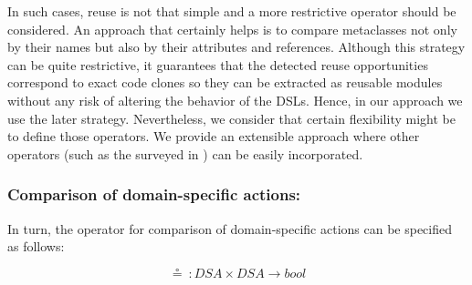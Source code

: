 In such cases, reuse is not that simple and a more restrictive operator should be considered. An approach that certainly helps is to compare metaclasses not only by their names but also by their attributes and references. Although this strategy can be quite restrictive, it guarantees that the detected reuse opportunities correspond to exact code clones so they can be extracted as reusable modules without any risk of altering the behavior of the DSLs. Hence, in our approach we use the later strategy. Nevertheless, we consider that certain flexibility might be to define those operators. We provide an extensible approach where other operators (such as the surveyed in \cite{Lafi:2011}) can be easily incorporated.



\vspace{-3mm}
\subsubsection{Comparison of domain-specific actions:} In turn, the operator for comparison of domain-specific actions can be specified as follows:

\begin{equation}
  \circeq~: DSA \times DSA \rightarrow bool
\end{equation}

